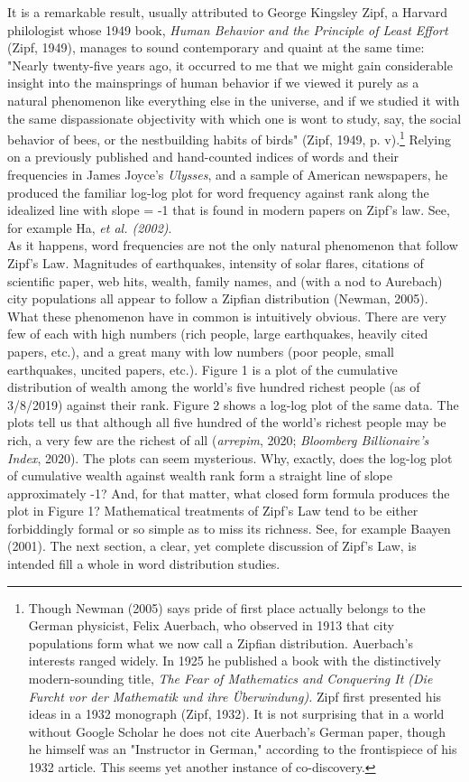 \documentclass[12pt]{article}
\begin{document}
It is a remarkable result, usually attributed to George Kingsley Zipf, a Harvard philologist  whose 1949 book, \emph {Human Behavior and the Principle of Least Effort} (Zipf, 1949), manages to sound contemporary and quaint at the same time: "Nearly twenty-five years ago, it occurred to me that we might gain considerable insight into the mainsprings of human behavior if we viewed it purely as a natural phenomenon like everything else in the universe, and if we studied it with the same dispassionate objectivity with which one is wont to study, say, the social behavior of bees, or the nestbuilding habits of birds" (Zipf, 1949, p. v).\footnote[1]{Though Newman (2005) says pride of first place actually belongs to the German physicist, Felix Auerbach, who observed in 1913 that city populations form what we now call a Zipfian distribution.  Auerbach's interests ranged widely. In 1925 he published a book with the distinctively modern-sounding title,\emph{ The Fear of Mathematics and Conquering It (Die Furcht vor der Mathematik und ihre Überwindung).} Zipf first presented his ideas in a 1932 monograph (Zipf, 1932).  It is not surprising that in a world without Google Scholar he does not cite Auerbach's German paper, though he himself was an "Instructor in German," according to the frontispiece of his 1932 article. This seems yet another instance of co-discovery.}  Relying on a previously published and hand-counted indices of words and their frequencies in James Joyce's \emph{Ulysses}, and a sample of American newspapers, he produced the familiar log-log plot for word frequency against rank along the idealized line with slope = -1 that is found in modern papers on Zipf's law.  See, for example Ha, \emph{et al. (2002)}. \\
\indent As it happens, word frequencies are not the only natural phenomenon that follow Zipf's Law. Magnitudes of earthquakes, intensity of solar flares, citations of scientific paper, web hits, wealth, family names, and (with a nod to Aurebach) city populations all appear to follow a Zipfian distribution (Newman, 2005).  What these phenomenon have in common is intuitively obvious.  There are very few of each with high numbers (rich people, large earthquakes, heavily cited papers, etc.), and a great many with low numbers (poor people, small earthquakes, uncited papers, etc.).   Figure 1 is a plot of the cumulative distribution of wealth among the world's five hundred richest people (as of 3/8/2019) against their rank.  Figure 2 shows a log-log plot of the same data. The plots tell us that although all five hundred of the world's richest people may be rich, a very few are the richest of all (\emph{arrepim}, 2020; \emph{Bloomberg Billionaire's Index}, 2020).  The plots can seem mysterious.  Why, exactly, does the log-log plot of cumulative wealth against wealth rank form a straight line of slope approximately -1? And, for that matter, what closed form formula produces the plot in Figure 1?  Mathematical treatments of Zipf's Law tend to be either forbiddingly formal or so simple as to miss its richness.  See, for example Baayen (2001).   The next section, a clear, yet complete discussion of Zipf's Law, is intended fill a whole in word distribution studies.  
\end{document}
